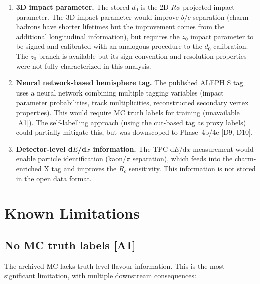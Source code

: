 \documentclass[11pt,a4paper]{article}
\begin{document}
\begin{enumerate}
\item \textbf{3D impact parameter.} The stored $d_0$ is the 2D $R\phi$-projected
impact parameter. The 3D impact parameter would improve $b/c$ separation (charm
hadrons have shorter lifetimes but the improvement comes from the additional
longitudinal information), but requires the $z_0$ impact parameter to be signed and
calibrated with an analogous procedure to the $d_0$ calibration. The $z_0$ branch
is available but its sign convention and resolution properties were not fully
characterized in this analysis.

\item \textbf{Neural network-based hemisphere tag.} The published ALEPH S
tag~\cite{ALEPH:Rb:1996} uses a neural network combining multiple tagging variables
(impact parameter probabilities, track multiplicities, reconstructed secondary vertex
properties). This would require MC truth labels for training (unavailable [A1]). The
self-labelling approach (using the cut-based tag as proxy labels) could partially
mitigate this, but was downscoped to Phase~4b/4c [D9, D10].

\item \textbf{Detector-level d$E$/d$x$ information.} The TPC d$E$/d$x$ measurement
would enable particle identification (kaon/$\pi$ separation), which feeds into the
charm-enriched X tag and improves the $R_c$ sensitivity. This information is not
stored in the open data format.
\end{enumerate}

\FloatBarrier
{}
\section{Known Limitations}
\label{sec:limitations}

\subsection{No MC truth labels [A1]}

The archived MC lacks truth-level flavour information. This is the most significant
limitation, with multiple downstream consequences:
\end{document}
